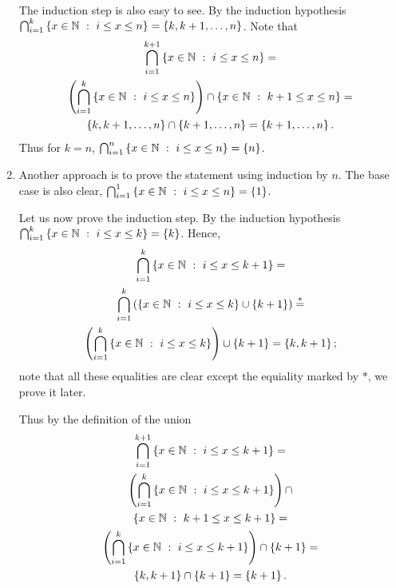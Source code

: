 \begin{chapterendexercises}
\begin{solution}
\begin{enumerate}
          The induction step is also easy to see. By the induction hypothesis
          $\bigcap_{i = 1}^k \set[i \le x \le n]{x \in \N} = 
            \set{k, k + 1, \dots, n}$.
          Note that
          \begin{multline*}
            \bigcap_{i = 1}^{k + 1} \set[i \le x \le n]{x \in \N} = \\
            \left(
              \bigcap_{i = 1}^k \set[i \le x \le n]{x \in \N} 
            \right) \cap
            \set[k + 1 \le x \le n]{x \in \N} =  \\
            \set{k, k + 1, \dots, n} \cap \set{k + 1, \dots, n} =
            \set{k + 1, \dots, n}.
          \end{multline*}
          Thus for $k = n$,
          $\bigcap_{i = 1}^n \set[i \le x \le n]{x \in \N} = \set{n}$.
        \item Another approach is to prove the statement using induction by $n$.
          The base case is also clear,
          $\bigcap_{i = 1}^1 \set[i \le x \le n]{x \in \N} = \set{1}$.

          Let us now prove the induction step. By the induction hypothesis
          $\bigcap_{i = 1}^k \set[i \le x \le k]{x \in \N} = \set{k}$.
          Hence,
          \begin{multline*}
            \bigcap_{i = 1}^k \set[i \le x \le k + 1]{x \in \N} = \\
            \bigcap_{i = 1}^k 
              \left(
                \set[i \le x \le k]{x \in \N} \cup \set{k + 1}
              \right)
            \stackrel{*}{=} \\
            \left(\bigcap_{i = 1}^k \set[i \le x \le k]{x \in \N} \right) \cup
            \set{k + 1} =
            \set{k, k + 1};
          \end{multline*}
          note that all these equalities are clear except the equiality marked
          by $*$, we prove it later.

          Thus by the definition of the union
          \begin{multline*}
            \bigcap_{i = 1}^{k + 1} \set[i \le x \le k + 1]{x \in \N} = \\
            \left(
              \bigcap_{i = 1}^k \set[i \le x \le k + 1]{x \in \N}
            \right) \cap \\
            \set[k + 1 \le x \le k + 1]{x \in \N}= \\
            \left(
              \bigcap_{i = 1}^k \set[i \le x \le k + 1]{x \in \N}
            \right) \cap
            \set{k + 1} = \\
            \set{k, k + 1} \cap \set{k + 1} =
            \set{k + 1}.
          \end{multline*}


\end{enumerate}
\end{solution}
\end{chapterendexercises}
